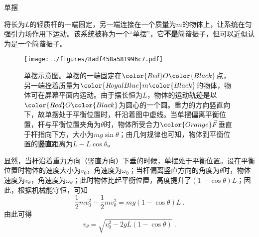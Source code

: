 \begin{example}{单摆}

将长为$L$的轻质杆的一端固定，另一端连接在一个质量为$m$的物体上，让系统在匀强引力场作用下运动。该系统被称为一个“单摆”，它\textbf{不是}简谐振子，但可以近似认为是一个简谐振子。


\begin{figure}[ht]
\centering
\texttt{[image: ./figures/8adf458a581996c7.pdf]}
\caption{单摆示意图。单摆的一端固定在$\color{Red}O\color{Black}$点，另一端拴着质量为$\color{RoyalBlue}m\color{Black}$的物体，物体可在屏幕平面内运动。由于摆长恒为$L$，物体的运动轨迹是以$\color{Red}O\color{Black}$为圆心的一个圆。重力的方向竖直向下，故单摆处于平衡位置时，杆沿着图中虚线。当单摆偏离平衡位置，杆与平衡位置夹角为$\theta$时，物体所受合力$\color{Orange}\vec{F}$垂直于杆指向下方，大小为$mg\sin\theta$；由几何规律也可知，物体到平衡位置的\textbf{竖直}距离为$L-L\cos\theta$。} \label{fig_SHOhs_1}
\end{figure}


显然，当杆沿着重力方向（竖直方向）下垂的时候，单摆处于平衡位置。设在平衡位置时物体的速度大小为$v_0$，角速度为$\omega_0$；当杆偏离竖直方向的角度为$\theta$时，物体速度为$v_\theta$，角速度为$\omega_\theta$；此时物体比起平衡位置，高度提升了$(1-\cos\theta)L$；因此，根据机械能守恒，可知
\begin{equation}
\frac{1}{2}mv_0^2-\frac{1}{2}mv_\theta^2 = mg(1-\cos\theta)L~. 
\end{equation}
由此可得
\begin{equation}
v_\theta = \sqrt{v_0^2-2gL(1-\cos\theta)} ~. 
\end{equation}

\end{example}



















